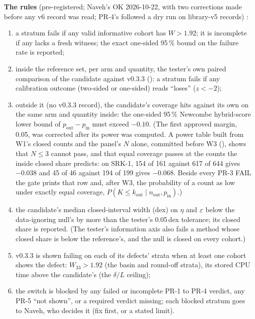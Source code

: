 \textbf{The rules} (pre-registered; Naveh's OK 2026-10-22, with two corrections made before any v6 record was read;
PR-4's followed a dry run on library-v5 records)
:
\begin{enumerate}[nosep]
  \item[PR-1] a stratum fails if any valid informative cohort has $W>1.92$; it is incomplete if any lacks a fresh
    witness; the exact one-sided 95\,\% bound on the failure rate is reported;
  \item[PR-2] inside the reference set, per arm and quantity, the tester's own paired comparison of the candidate
    against v0.3.3 (): a stratum fails if any calibration outcome (two-sided or one-sided)
    reads ``loses'' ($z<-2$);
  \item[PR-3] outside it (no v0.3.3 record), the candidate's coverage hits against its own on the same arm and
    quantity inside: the one-sided 95\,\% Newcombe hybrid-score lower bound of $p_{\mathrm{out}}-p_{\mathrm{in}}$ must
    exceed $-0.10$. (The first approved margin, 0.05, was corrected after its power was computed. A power table built
    from W1's closed counts and the panel's $N$ alone, committed before W3 (), shows that
    $N\le3$ cannot pass, and that equal coverage passes at the counts the inside closed share predicts: on SRK-1,
    154 of 161 against 617 of 644 gives $-0.038$ and 45 of 46 against 194 of 199 gives $-0.068$. Beside every PR-3 FAIL
    the gate prints that row and, after W3, the probability of a count as low under exactly equal coverage,
    $P(K\le k_{\mathrm{out}}\mid n_{\mathrm{out}},p_{\mathrm{in}})$.)
  \item[PR-4] the candidate's median closed-interval width (dex) on $\eta$ and $\varepsilon$ below the data-ignoring null's by
    more than the tester's 0.05\,dex tolerance; its closed share is reported. (The tester's information axis also
    fails a method whose closed share is below the reference's, and the null is closed on every cohort.)
  \item[PR-5] v0.3.3 is shown failing on each of its defects' strata when at least one cohort shows the defect:
    $W_{33}>1.92$ (the basin and round-off strata), its stored CPU time above the candidate's (the $\delta/L$ ceiling);
  \item[PR-6] the switch is blocked by any failed or incomplete PR-1 to PR-4 verdict, any PR-5 ``not shown'', or a
    required verdict missing; each blocked stratum goes to Naveh, who decides it (fix first, or a stated limit).
\end{enumerate}
